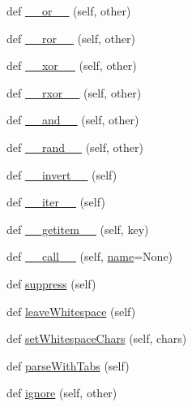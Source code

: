 \begin{DoxyCompactItemize}
\item 
def \hyperlink{classpyparsing_1_1ParserElement_a1c5f1f8d8ba28723519c37d3416cf6c0}{\+\_\+\+\_\+or\+\_\+\+\_\+} (self, other)
\item 
def \hyperlink{classpyparsing_1_1ParserElement_ab552d5b159a2e499fd867f183fec259f}{\+\_\+\+\_\+ror\+\_\+\+\_\+} (self, other)
\item 
def \hyperlink{classpyparsing_1_1ParserElement_adc202acd38036ea9b404b20bc9833cbe}{\+\_\+\+\_\+xor\+\_\+\+\_\+} (self, other)
\item 
def \hyperlink{classpyparsing_1_1ParserElement_a1192254acf0ffd8b84034e984e271e1b}{\+\_\+\+\_\+rxor\+\_\+\+\_\+} (self, other)
\item 
def \hyperlink{classpyparsing_1_1ParserElement_a243eaac2e462c82b0cb8fde4108afbf7}{\+\_\+\+\_\+and\+\_\+\+\_\+} (self, other)
\item 
def \hyperlink{classpyparsing_1_1ParserElement_aeee7cc2cc9529f45892705c80a41aced}{\+\_\+\+\_\+rand\+\_\+\+\_\+} (self, other)
\item 
def \hyperlink{classpyparsing_1_1ParserElement_aecad4d0c5430e41858a02de5ed5611e0}{\+\_\+\+\_\+invert\+\_\+\+\_\+} (self)
\item 
def \hyperlink{classpyparsing_1_1ParserElement_a8c8264e791744827f5d9857c85fe33cf}{\+\_\+\+\_\+iter\+\_\+\+\_\+} (self)
\item 
def \hyperlink{classpyparsing_1_1ParserElement_a5ec18bd599ba5e749056ebe43e3d7bf3}{\+\_\+\+\_\+getitem\+\_\+\+\_\+} (self, key)
\item 
def \hyperlink{classpyparsing_1_1ParserElement_a46450a967b8cf18e76e893532de0ecd7}{\+\_\+\+\_\+call\+\_\+\+\_\+} (self, \hyperlink{classpyparsing_1_1ParserElement_ab51381d24c5bc721b4a4764af8d9b470}{name}=None)
\item 
def \hyperlink{classpyparsing_1_1ParserElement_aa59fe575380165c82b618b55e91ef0a5}{suppress} (self)
\item 
def \hyperlink{classpyparsing_1_1ParserElement_ac3de85a4c5fed7bc8d10967c7c985f8a}{leave\+Whitespace} (self)
\item 
def \hyperlink{classpyparsing_1_1ParserElement_a02335ae8eec55cf3944fd79769a4104e}{set\+Whitespace\+Chars} (self, chars)
\item 
def \hyperlink{classpyparsing_1_1ParserElement_af81ca1164a8903a8595c1bfec35316cd}{parse\+With\+Tabs} (self)
\item 
def \hyperlink{classpyparsing_1_1ParserElement_ae091af36b550112da1a00aa314206d2d}{ignore} (self, other)
\item 

\end{DoxyCompactItemize}
